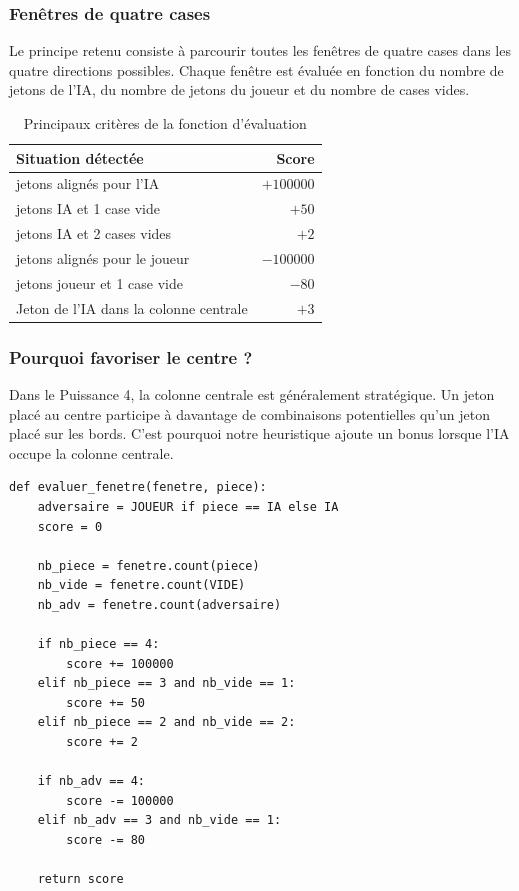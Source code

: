 \documentclass[12pt,a4paper]{article}
\begin{document}
\subsubsection{Fenêtres de quatre cases}

Le principe retenu consiste à parcourir toutes les fenêtres de quatre cases dans les quatre directions possibles. Chaque fenêtre est évaluée en fonction du nombre de jetons de l'IA, du nombre de jetons du joueur et du nombre de cases vides.

\begin{table}[H]
    \centering
    \begin{tabular}{>{\raggedright\arraybackslash}p{8cm}r}
        \toprule
        Situation détectée & Score \\
        \midrule
        4 jetons alignés pour l'IA & $+100000$ \\
        3 jetons IA et 1 case vide & $+50$ \\
        2 jetons IA et 2 cases vides & $+2$ \\
        4 jetons alignés pour le joueur & $-100000$ \\
        3 jetons joueur et 1 case vide & $-80$ \\
        Jeton de l'IA dans la colonne centrale & $+3$ \\
        \bottomrule
    \end{tabular}
    \caption{Principaux critères de la fonction d'évaluation}
\end{table}

\subsubsection{Pourquoi favoriser le centre ?}

Dans le Puissance 4, la colonne centrale est généralement stratégique. Un jeton placé au centre participe à davantage de combinaisons potentielles qu'un jeton placé sur les bords. C'est pourquoi notre heuristique ajoute un bonus lorsque l'IA occupe la colonne centrale.

\begin{lstlisting}[style=pythonstyle, caption={Extrait de la fonction d'évaluation}]
def evaluer_fenetre(fenetre, piece):
    adversaire = JOUEUR if piece == IA else IA
    score = 0

    nb_piece = fenetre.count(piece)
    nb_vide = fenetre.count(VIDE)
    nb_adv = fenetre.count(adversaire)

    if nb_piece == 4:
        score += 100000
    elif nb_piece == 3 and nb_vide == 1:
        score += 50
    elif nb_piece == 2 and nb_vide == 2:
        score += 2

    if nb_adv == 4:
        score -= 100000
    elif nb_adv == 3 and nb_vide == 1:
        score -= 80

    return score
\end{lstlisting}
\end{document}
